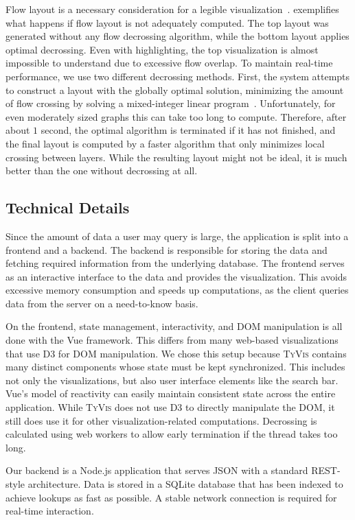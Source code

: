 \documentclass{vgtc}                          %
\newcommand{\ourmethodplaintext}{\textsc{TyVis}\xspace}
\newcommand{\ourmethod}{{\sc \ourmethodplaintext}\xspace}
\begin{document}
Flow layout is a necessary consideration for a legible visualization~\cite{sugiyama:1981}.
 exemplifies what happens if flow layout is not adequately computed.
The top layout was generated without any flow decrossing algorithm, while the bottom layout applies optimal decrossing.
Even with highlighting, the top visualization is almost impossible to understand due to excessive flow overlap.
To maintain real-time performance, we use two different decrossing methods.
First, the system attempts to construct a layout with the globally optimal solution, minimizing the amount of flow crossing by solving a mixed-integer linear program~\cite{ebner:2005}.
Unfortunately, for even moderately sized graphs this can take too long to compute.
Therefore, after about $1$ second, the optimal algorithm is terminated if it has not finished, and the final layout is computed by a faster algorithm that only minimizes local crossing between layers.
While the resulting layout might not be ideal, it is much better than the one without decrossing at all.

\subsection{Technical Details}

Since the amount of data a user may query is large, the application is split into a frontend and a backend.
The backend is responsible for storing the data and fetching required information from the underlying database.
The frontend serves as an interactive interface to the data and provides the visualization.
This avoids excessive memory consumption and speeds up computations, as the client queries data from the server on a need-to-know basis.

On the frontend, state management, interactivity, and DOM manipulation is all done with the Vue framework.
This differs from many web-based visualizations that use D3 for DOM manipulation.
We chose this setup because \ourmethod contains many distinct components whose state must be kept synchronized.
This includes not only the visualizations, but also user interface elements like the search bar.
Vue's model of reactivity can easily maintain consistent state across the entire application.
While \ourmethod does not use D3 to directly manipulate the DOM, it still does use it for other visualization-related computations.
Decrossing is calculated using web workers to allow early termination if the thread takes too long.

Our backend is a Node.js application that serves JSON with a standard REST-style architecture.
Data is stored in a SQLite database that has been indexed to achieve lookups as fast as possible.
A stable network connection is required for real-time interaction.
\end{document}
